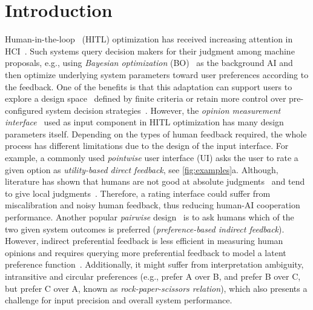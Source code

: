 \documentclass[acmsmall,screen,nonacm]{acmart}
\begin{document}
\section{Introduction}
\label{sec:intro}
Human-in-the-loop~\cite{monarch2021hitl} (HITL) optimization has received increasing attention in HCI~\cite{zhou2021interactive, chan2022chi}. Such systems query decision makers for their judgment among machine proposals, e.g., using \emph{Bayesian optimization} (BO)~\cite{kushner1964bo, shahriari2016bo-review} as the background AI and then optimize underlying system parameters toward user preferences according to the feedback. One of the benefits is that this adaptation can support users to explore a design space~\cite{koyama2020sequential, koyama2021ui, chan2022chi} defined by finite criteria or retain more control over pre-configured system decision strategies~\cite{russell2019human}.
%
However, the \emph{opinion measurement interface}~\cite{nobarany2012opinion} used as input component in HITL optimization has many design parameters itself. Depending on the types of human feedback required, the whole process has different limitations due to the design of the input interface.
%
For example, a commonly used \emph{pointwise} user interface (UI) asks the user to rate a given option as \emph{utility-based direct feedback}, see \autoref{fig:examples}a. Although, literature has shown that humans are not good at absolute judgments~\cite{tversky1974judgment} and tend to give local judgments~\cite{brochu2007active}. Therefore, a rating interface could suffer from miscalibration and noisy human feedback, thus reducing human-AI cooperation performance.
%
Another popular \emph{pairwise} design~\cite{brochu2007active, christiano2017deep} is to ask humans which of the two given system outcomes is preferred (\emph{preference-based indirect feedback}). However, indirect preferential feedback is less efficient in measuring human opinions and requires querying more preferential feedback to model a latent preference function~\cite{gonzalez2017pbo, siivola2021preferential, nguyen2021topk}. Additionally, it might suffer from interpretation ambiguity, intransitive and circular preferences (e.g., prefer A over B, and prefer B over C, but prefer C over A, known as \emph{rock-paper-scissors relation}), which also presents a challenge for input precision and overall system performance.
\end{document}
